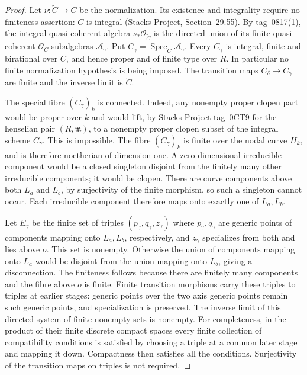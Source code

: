 \begin{proof}
Let $\nu:\widetilde C\to C$ be the normalization. Its existence
and integrality require no finiteness assertion: $C$ is integral
(Stacks Project, Section~29.55). By tag~0817(1), the integral
quasi-coherent algebra $\nu_*\mathcal O_{\widetilde C}$ is the
directed union of its finite quasi-coherent
$\mathcal O_C$-subalgebras $\mathcal A_\gamma$. Put
$C_\gamma=\operatorname{Spec}_C\mathcal A_\gamma$. Every
$C_\gamma$ is integral, finite and birational over $C$, and hence
proper and of finite type over $R$. In particular no finite
normalization hypothesis is being imposed. The transition maps
$C_\delta\to C_\gamma$ are finite and the inverse limit is
$\widetilde C$.

The special fibre $(C_\gamma)_k$ is connected. Indeed, any
nonempty proper clopen part would be proper over $k$ and would
lift, by Stacks Project tag~0CT9 for the henselian pair
$(R,\mathfrak m)$, to a nonempty proper clopen subset of the
integral scheme $C_\gamma$. This is impossible.
The fibre $(C_\gamma)_k$ is finite over the nodal curve $H_k$,
and is therefore noetherian of dimension one. A zero-dimensional
irreducible component would be a closed singleton disjoint from
the finitely many other irreducible components; it would be clopen.
There are curve components above both $L_a$ and $L_b$, by
surjectivity of the finite morphism, so such a singleton cannot
occur. Each irreducible component therefore maps onto exactly one
of $L_a,L_b$.

Let $E_\gamma$ be the finite set of triples $(p_\gamma,q_\gamma,
z_\gamma)$ where $p_\gamma,q_\gamma$ are generic points of
components mapping onto $L_a,L_b$, respectively, and
$z_\gamma$ specializes from both and lies above $o$.
This set is nonempty. Otherwise the union of components mapping
onto $L_a$ would be disjoint from the union mapping onto $L_b$,
giving a disconnection. The finiteness follows because there are
finitely many components and the fibre above $o$ is finite.
Finite transition morphisms carry these triples to triples at
earlier stages: generic points over the two axis generic points
remain such generic points, and specialization is preserved.
The inverse limit of this directed system of finite nonempty sets
is nonempty. For completeness, in the product of their finite
discrete compact spaces every finite collection of compatibility
conditions is satisfied by choosing a triple at a common later
stage and mapping it down. Compactness then satisfies all the
conditions. Surjectivity of the transition maps on triples is not
required.


\end{proof}
